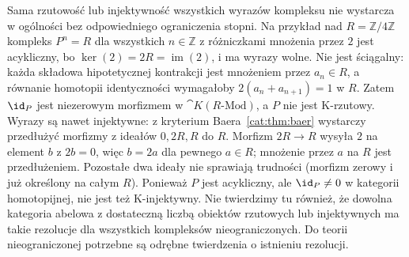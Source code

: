 \begin{uwaga}
Sama rzutowość lub injektywność wszystkich wyrazów kompleksu nie wystarcza w ogólności bez odpowiedniego ograniczenia stopni. Na przykład nad $R=\mathbb Z/4\mathbb Z$ kompleks $P^n=R$ dla wszystkich $n\in\mathbb Z$ z różniczkami mnożenia przez $2$ jest acykliczny, bo $\ker(2)=2R=\operatorname{im}(2)$, i ma wyrazy wolne. Nie jest ściągalny: każda składowa hipotetycznej kontrakcji jest mnożeniem przez $a_n\in R$, a równanie homotopii identyczności wymagałoby $2(a_n+a_{n+1})=1$ w $R$. Zatem $\id_P$ jest niezerowym morfizmem w $\cat K(R\text{-}\mathrm{Mod})$, a $P$ nie jest K-rzutowy. Wyrazy są nawet injektywne: z kryterium Baera~\ref{cat:thm:baer} wystarczy przedłużyć morfizmy z ideałów $0,2R,R$ do $R$. Morfizm $2R\to R$ wysyła $2$ na element $b$ z $2b=0$, więc $b=2a$ dla pewnego $a\in R$; mnożenie przez $a$ na $R$ jest przedłużeniem. Pozostałe dwa ideały nie sprawiają trudności (morfizm zerowy i już określony na całym $R$). Ponieważ $P$ jest acykliczny, ale $\id_P\ne0$ w kategorii homotopijnej, nie jest też K-injektywny. Nie twierdzimy tu również, że dowolna kategoria abelowa z dostateczną liczbą obiektów rzutowych lub injektywnych ma takie rezolucje dla wszystkich kompleksów nieograniczonych. Do teorii nieograniczonej potrzebne są odrębne twierdzenia o istnieniu rezolucji.
\end{uwaga}

